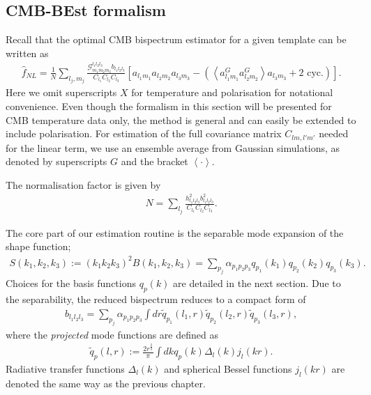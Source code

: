\subsection{CMB-BEst formalism}
Recall that the optimal CMB bispectrum estimator for a given template can be written as
\begin{align}
	\hat{f}_{NL} = \frac{1}{N} \sum_{l_j,m_j} \frac{\mathcal{G}^{l_1 l_2 l_3}_{m_1 m_2 m_3} b_{l_1 l_2 l_3}}{C_{l_1} C_{l_2} C_{l_3}} \left[ a_{l_1 m_1} a_{l_2 m_2} a_{l_3 m_3} - \left( \left< a^G_{l_1 m_1} a^G_{l_2 m_2} \right> a_{l_3 m_3} + \text{2\ cyc.} \right)  \right].		\label{eqn:bispectrum_estimator_standard}
\end{align}
Here we omit superscripts $X$ for temperature and polarisation for notational convenience. Even though the formalism in this section will be presented for CMB temperature data only, the method is general and can easily be extended to include polarisation. For estimation of the full covariance matrix $C_{lm,l'm'}$ needed for the linear term, we use an ensemble average from Gaussian simulations, as denoted by superscripts $G$ and the bracket $\left<\cdot\right>$.

The normalisation factor is given by
\begin{align}
	N = \sum_{l_j} \frac{h_{l_1 l_2 l_3}^2 b_{l_1 l_2 l_3}^2}{C_{l_1} C_{l_2} C_{l_3}}.
\end{align}

The core part of our estimation routine is the separable mode expansion of the shape function;
\begin{align}
	S(k_1, k_2, k_3) := (k_1 k_2 k_3)^2 B(k_1, k_2, k_3) = \sum_{p_j} \alpha_{p_1 p_2 p_3} q_{p_1}(k_1) q_{p_2}(k_2) q_{p_3}(k_3).
\end{align}
Choices for the basis functions $q_p(k)$ are detailed in the next section. Due to the separability, the reduced bispectrum reduces to a compact form of
\begin{align}
	b_{l_1 l_2 l_3} = \sum_{p_j} \alpha_{p_1 p_2 p_3} \int dr \tilde{q}_{p_1}(l_1,r) \tilde{q}_{p_2}(l_2,r) \tilde{q}_{p_3}(l_3,r),
\end{align}
where the \textit{projected} mode functions are defined as
\begin{align}
	\tilde{q}_{p}(l,r) := \frac{2r^\frac{2}{3}}{\pi} \int dk q_p(k) \Delta_l(k) j_l (kr).
\end{align}
Radiative transfer functions $\Delta_l(k)$ and spherical Bessel functions $j_l(kr)$ are denoted the same way as the previous chapter.

